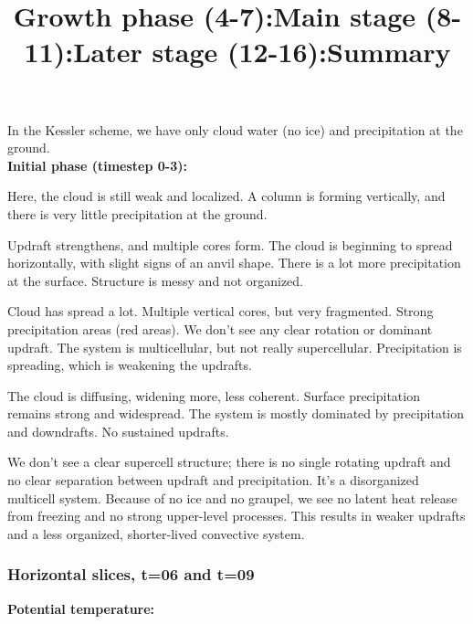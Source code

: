 \documentclass{article}
\begin{document}
In the Kessler scheme, we have only cloud water (no ice) and precipitation at the ground. \\

\textbf{Initial phase (timestep 0-3):}

Here, the cloud is still weak and localized. A column is forming vertically, and there is very little precipitation at the ground. \\

\title{Growth phase (4-7):}

Updraft strengthens, and multiple cores form. The cloud is beginning to spread horizontally, with slight signs of an anvil shape. There is a lot more precipitation at the surface. Structure is messy and not organized. \\ 

\title{Main stage (8-11):}

Cloud has spread a lot. Multiple vertical cores, but very fragmented. Strong precipitation areas (red areas). We don't see any clear rotation or dominant updraft. The system is multicellular, but not really supercellular. Precipitation is spreading, which is weakening the updrafts. \\

\title{Later stage (12-16):}

The cloud is diffusing, widening more, less coherent. Surface precipitation remains strong and widespread. The system is mostly dominated by precipitation and downdrafts. No sustained updrafts. \\

\title{Summary}

We don't see a clear supercell structure; there is no single rotating updraft and no clear separation between updraft and precipitation. It's a disorganized multicell system. Because of no ice and no graupel, we see no latent heat release from freezing and no strong upper-level processes. This results in weaker updrafts and a less organized, shorter-lived convective system. 

\subsubsection*{Horizontal slices, t=06 and t=09}

\textbf{Potential temperature:}
\end{document}
